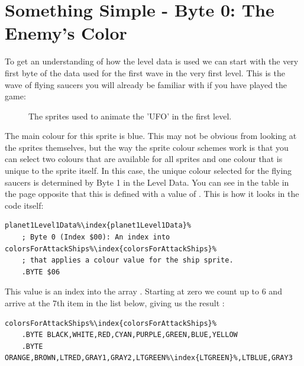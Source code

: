 \section{Something Simple - Byte 0: The Enemy's Color}
To get an understanding of how the level data is used we can start with the very first byte of the data
used for the first wave in the very first level. This is the wave of flying saucers you will already be
familiar with if you have played the game:
\begin{figure}[H]
  {
    \setlength{\tabcolsep}{3.0pt}
    \setlength\cmidrulewidth{\heavyrulewidth} %
	\centering
	\def\MULTICOLORONE{white}
	\def\MULTICOLORTWO{red}
	\def\SPRITECOLOR{blue}
	\begin{subfigure}{0.3\textwidth}
		
	\end{subfigure}
	\begin{subfigure}{0.3\textwidth}
		
	\end{subfigure}
	\begin{subfigure}{0.3\textwidth}
		
	\end{subfigure}
  }\caption[position=top]{The sprites used to animate the 'UFO' in the first level.}
\end{figure}

The main colour for this sprite is blue. This may not be obvious from looking at the sprites themselves, but
the way the sprite colour schemes work is that you can select two colours that are available for all sprites and
one colour that is unique to the sprite itself. In this case, the unique colour selected for the flying saucers is
determined by Byte 1 in the Level Data. You can see in the table in the page opposite
that this is defined with a value of . This is how it looks in the code itself:

\begin{lstlisting}[escapechar=\%]
planet1Level1Data%\index{planet1Level1Data}%
    ; Byte 0 (Index $00): An index into colorsForAttackShips%\index{colorsForAttackShips}% 
    ; that applies a colour value for the ship sprite.
    .BYTE $06
\end{lstlisting}

This value is an index into the array . Starting at zero we count up to 6
and arrive at the 7th item in the list below, giving us the result :
\begin{lstlisting}[escapechar=\%]
colorsForAttackShips%\index{colorsForAttackShips}%
    .BYTE BLACK,WHITE,RED,CYAN,PURPLE,GREEN,BLUE,YELLOW
    .BYTE ORANGE,BROWN,LTRED,GRAY1,GRAY2,LTGREEN%\index{LTGREEN}%,LTBLUE,GRAY3
\end{lstlisting}

